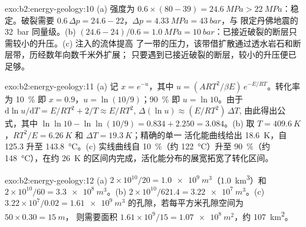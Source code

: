 \begin{solution}{exo:b2:energy-geology:10}
(a) 强度为 $0.6 \times (80 - 39) = \qty{24.6}{MPa} > \qty{22}{MPa}$：稳定。破裂需要
$0.6\,\Delta p = 24.6 - 22$，$\Delta p = \qty{4.33}{MPa} = \qty{43}{bar}$，与
限定丹佛地震的 \qty{32}{bar} 同量级。(b) $(24.6 - 24)/0.6 = \qty{1.0}{MPa} =
\qty{10}{bar}$：已接近破裂的断层只需较小的升压。(c) 注入的流体提高
了一带的压力，该带借扩散通过透水岩石和断层带，历经数年向数千米外扩展；
只要遇到已接近破裂的断层，较小的升压便已足够。
\end{solution}

\begin{solution}{exo:b2:energy-geology:11}
(a) 记 $x = e^{-u}$，其中 $u = (ART^2/\beta E)\,e^{-E/RT}$。转化率为
\qty{10}{\percent} 即 $x = 0.9$，$u = \ln(10/9)$；\qty{90}{\percent} 即 $u = \ln 10$。由于
$\mathrm{d}\ln u/\mathrm{d}T = E/RT^2 + 2/T \approx E/RT^2$, $\Delta(\ln u) \approx (E/RT^2)\,\Delta T$,
由此得出公式，其中 $\ln\ln 10 - \ln\ln(10/9) = 0.834 + 2.250 = 3.084$。(b) 取 $T =
\qty{409.6}{K}$，$RT^2/E = \qty{6.26}{K}$ 和 $\Delta T = \qty{19.3}{K}$；精确的单一
活化能曲线给出 \qty{18.6}{K}，自 125.3 升至 \qty{143.8}{\celsius}。(c) 实线曲线自
\qty{10}{\percent}（约 \qty{122}{\celsius}）升至 \qty{90}{\percent}（约 \qty{148}{\celsius}），在约
\qty{26}{K} 的区间内完成，活化能分布的展宽拓宽了转化区间。
\end{solution}

\begin{solution}{exo:b2:energy-geology:12}
(a) $2 \times 10^{10}/20 = \qty{1.0e9}{m^3}$（\qty{1.0}{km^3}）和 $2 \times 10^{10}/60 =
\qty{3.3e8}{m^3}$。(b) $2 \times 10^{10}/621.4 = \qty{3.22e7}{m^3}$。(c) $3.22 \times 10^7/0.02 =
\qty{1.61e9}{m^3}$ 的孔隙，若每平方米孔隙空间为 $50 \times 0.30 = \qty{15}{m}$，
则需要面积 $1.61 \times 10^9/15 = \qty{1.07e8}{m^2}$，约 \qty{107}{km^2}。
\end{solution}

